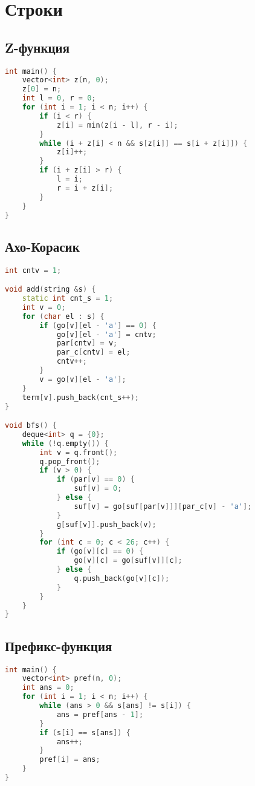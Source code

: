 \documentclass[10pt,a4paper,landscape,twosided]{extarticle}
\begin{document}
\begin{multicols}{3}
\begin{lstlisting}[language=C++]
\end{lstlisting}

\section{Строки}

\subsection{Z-функция}
\begin{lstlisting}[language=C++]
int main() {
    vector<int> z(n, 0);
    z[0] = n;
    int l = 0, r = 0;
    for (int i = 1; i < n; i++) {
        if (i < r) {
            z[i] = min(z[i - l], r - i);
        }
        while (i + z[i] < n && s[z[i]] == s[i + z[i]]) {
            z[i]++;
        }
        if (i + z[i] > r) {
            l = i;
            r = i + z[i];
        }
    }
}

\end{lstlisting}

\subsection{Ахо-Корасик}
\begin{lstlisting}[language=C++]
int cntv = 1;

void add(string &s) {
    static int cnt_s = 1;
    int v = 0;
    for (char el : s) {
        if (go[v][el - 'a'] == 0) {
            go[v][el - 'a'] = cntv;
            par[cntv] = v;
            par_c[cntv] = el;
            cntv++;
        }
        v = go[v][el - 'a'];
    }
    term[v].push_back(cnt_s++);
}

void bfs() {
    deque<int> q = {0};
    while (!q.empty()) {
        int v = q.front();
        q.pop_front();
        if (v > 0) {
            if (par[v] == 0) {
                suf[v] = 0;
            } else {
                suf[v] = go[suf[par[v]]][par_c[v] - 'a'];
            }
            g[suf[v]].push_back(v);
        }
        for (int c = 0; c < 26; c++) {
            if (go[v][c] == 0) {
                go[v][c] = go[suf[v]][c];
            } else {
                q.push_back(go[v][c]);
            }
        }
    }
}

\end{lstlisting}

\subsection{Префикс-функция}
\begin{lstlisting}[language=C++]
int main() {
    vector<int> pref(n, 0);
    int ans = 0;
    for (int i = 1; i < n; i++) {
        while (ans > 0 && s[ans] != s[i]) {
            ans = pref[ans - 1];
        }
        if (s[i] == s[ans]) {
            ans++;
        }
        pref[i] = ans;
    }
}


\end{lstlisting}
\end{multicols}
\end{document}

